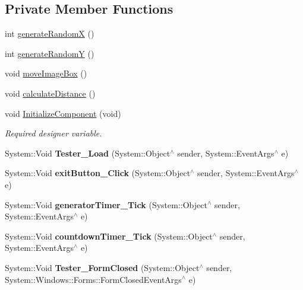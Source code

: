 \subsection*{Private Member Functions}
\begin{DoxyCompactItemize}
\item 
int \mbox{\hyperlink{class_gaze_track_g_u_i_1_1_tester_a76eaf835618462a5a78858946a0c8f12}{generate\+RandomX}} ()
\item 
int \mbox{\hyperlink{class_gaze_track_g_u_i_1_1_tester_af67ef1c7ec226026dfb05f2d7fb8245e}{generate\+RandomY}} ()
\item 
void \mbox{\hyperlink{class_gaze_track_g_u_i_1_1_tester_a5d43b09e8e58ab48a5299fabbdb075a6}{move\+Image\+Box}} ()
\item 
void \mbox{\hyperlink{class_gaze_track_g_u_i_1_1_tester_abbfdda1b0d394b72af518d259b150d75}{calculate\+Distance}} ()
\item 
void \mbox{\hyperlink{class_gaze_track_g_u_i_1_1_tester_a18f3d904b9d5a2faffb6c2ef4c5c58a3}{Initialize\+Component}} (void)
\begin{DoxyCompactList}\small\item\em Required designer variable. \end{DoxyCompactList}\item 
\mbox{\label{class_gaze_track_g_u_i_1_1_tester_ae594801ae74283c48436306e8b8b7031}} 
System\+::\+Void {\bfseries Tester\+\_\+\+Load} (System\+::\+Object$^\wedge$ sender, System\+::\+Event\+Args$^\wedge$ e)
\item 
\mbox{\label{class_gaze_track_g_u_i_1_1_tester_a9a1be2fe47795bd37496e9e9d6ebc6ca}} 
System\+::\+Void {\bfseries exit\+Button\+\_\+\+Click} (System\+::\+Object$^\wedge$ sender, System\+::\+Event\+Args$^\wedge$ e)
\item 
\mbox{\label{class_gaze_track_g_u_i_1_1_tester_a3629cfa07ca8b4b8c79728d0108720b6}} 
System\+::\+Void {\bfseries generator\+Timer\+\_\+\+Tick} (System\+::\+Object$^\wedge$ sender, System\+::\+Event\+Args$^\wedge$ e)
\item 
\mbox{\label{class_gaze_track_g_u_i_1_1_tester_afc18ba67318982c438251bb83239cb13}} 
System\+::\+Void {\bfseries countdown\+Timer\+\_\+\+Tick} (System\+::\+Object$^\wedge$ sender, System\+::\+Event\+Args$^\wedge$ e)
\item 
\mbox{\label{class_gaze_track_g_u_i_1_1_tester_a2ffc817b5ca0f066dcc648e156029b3e}} 
System\+::\+Void {\bfseries Tester\+\_\+\+Form\+Closed} (System\+::\+Object$^\wedge$ sender, System\+::\+Windows\+::\+Forms\+::\+Form\+Closed\+Event\+Args$^\wedge$ e)
\end{DoxyCompactItemize}
